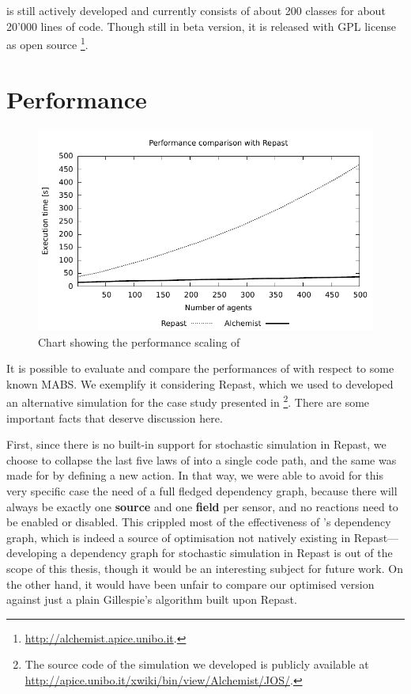 \documentclass[12pt,a4paper,twoside,openright]{book}
\begin{document}
\alchemist{} is still actively developed and currently consists of about 200 classes for about 20'000 lines of code. Though still in beta version, it is released with GPL license as open source \footnote{\mbox{\url{http://alchemist.apice.unibo.it}}.}.

\section{Performance}
\begin{figure}[t]
    \includegraphics[width=0.999999\columnwidth]{img/jos-graph01}
    \caption{Chart showing the performance scaling of \alchemist{}}
    \label{img:repastperf}
\end{figure}

It is possible to evaluate and compare the performances of \alchemist{} with respect to some known MABS.
%
We exemplify it considering Repast, which we used to developed an alternative simulation for the case study presented in \footnote{The source code of the simulation we developed is publicly available at \mbox{\url{http://apice.unibo.it/xwiki/bin/view/Alchemist/JOS/}.}}. There are some important facts that deserve discussion here.

First, since there is no built-in support for stochastic simulation in Repast, we choose to collapse the last five laws of  into a single code path, and the same was made for \alchemist{} by defining a new action.
%
In that way, we were able to avoid for this very specific case the need of a full fledged dependency graph, because there will always be exactly one \textbf{source} and one \textbf{field} per sensor, and no reactions need to be enabled or disabled.
%
This crippled most of the effectiveness of \alchemist{}'s dependency graph, which is indeed a source of optimisation not natively existing in Repast---developing a dependency graph for stochastic simulation in Repast is out of the scope of this thesis, though it would be an interesting subject for future work.
%
On the other hand, it would have been unfair to compare our optimised version against just a plain Gillespie's algorithm built upon Repast.
\end{document}
